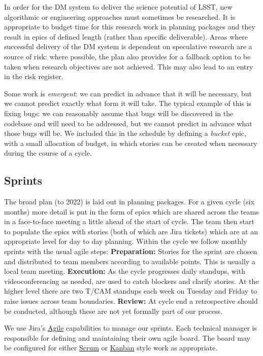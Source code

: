 In order for the DM system to deliver the science potential of LSST, new algorithmic or engineering approaches must sometimes be researched.
It is appropriate to budget time for this research work in planning packages and they result in epics of defined length (rather than specific  deliverable).
Areas where successful delivery of the DM system is dependent on speculative research are a source of risk: where possible, the plan  also provides for a fallback option to be taken when research objectives are not achieved.
This may also lead to an entry in the risk register.\cite{2016SPIE.9911E..0NK}


Some work is \emph{emergent}: we can predict in advance that it will be necessary, but we cannot
predict exactly what form it will take. The typical example of this is fixing bugs: we can reasonably
assume that bugs will be discovered in the codebase and will need to be addressed,
but we cannot predict in advance what those bugs will be.
We included this in the schedule by defining a \emph{bucket} epic, with a small allocation of budget, in which stories can be created
when necessary during the course of a cycle.

\subsection{Sprints} \label{sec:sprint} \label{sec:jira_ticket}
The broad plan (to 2022) is laid out in planning packages.
For a  given  cycle (six months)   more detail is put in the form of epics which  are shared across the teams in a face-to-face meeting a little ahead of the start of cycle.  The team then start to populate the epics with stories (both of which are Jira tickets)  which are at an appropriate level for day to day planning.
Within the cycle we follow monthly sprints with the usual agile steps:
\textbf{Preparation:} Stories for the sprint are chosen and distributed to team members according to available points. This is usually a local team meeting. \textbf{Execution:} As the cycle progresses daily standups, with videoconferencing as needed,  are used to catch blockers and clarify stories. At the higher level there are two T/CAM standups each week on Tuesday and Friday to raise issues across team boundaries. \textbf{Review:} At cycle end a retrospective should be conducted, although these are not yet formally part of our process.

We use Jira's
\href{https://www.atlassian.com/software/jira/agile}{Agile} capabilities
to manage our sprints. Each technical manager is responsible for
defining and maintaining their own agile board. The board may be
configured for either
\href{https://en.wikipedia.org/wiki/Scrum_(software_development)}{Scrum}
or \href{https://en.wikipedia.org/wiki/Kanban_(development)}{Kanban}
style work as appropriate.

